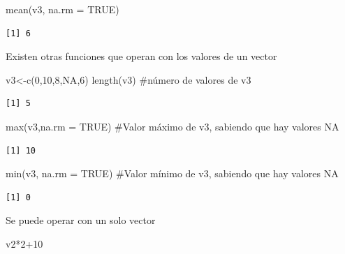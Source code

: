 \documentclass[
  letterpaper,
]{scrbook}
\newenvironment{Shaded}{\begin{snugshade}}{\end{snugshade}}
\newcommand{\AttributeTok}[1]{\textcolor[rgb]{0.40,0.45,0.13}{#1}}
\newcommand{\CommentTok}[1]{\textcolor[rgb]{0.37,0.37,0.37}{#1}}
\newcommand{\ConstantTok}[1]{\textcolor[rgb]{0.56,0.35,0.01}{#1}}
\newcommand{\DecValTok}[1]{\textcolor[rgb]{0.68,0.00,0.00}{#1}}
\newcommand{\FunctionTok}[1]{\textcolor[rgb]{0.28,0.35,0.67}{#1}}
\newcommand{\NormalTok}[1]{\textcolor[rgb]{0.00,0.23,0.31}{#1}}
\newcommand{\OtherTok}[1]{\textcolor[rgb]{0.00,0.23,0.31}{#1}}
\newcommand{\SpecialCharTok}[1]{\textcolor[rgb]{0.37,0.37,0.37}{#1}}
\begin{document}
\begin{Shaded}
\begin{Highlighting}[]
\FunctionTok{mean}\NormalTok{(v3, }\AttributeTok{na.rm =} \ConstantTok{TRUE}\NormalTok{)}
\end{Highlighting}
\end{Shaded}

\begin{verbatim}
[1] 6
\end{verbatim}

Existen otras funciones que operan con los valores de un vector

\begin{Shaded}
\begin{Highlighting}[]
\NormalTok{v3}\OtherTok{\textless{}{-}}\FunctionTok{c}\NormalTok{(}\DecValTok{0}\NormalTok{,}\DecValTok{10}\NormalTok{,}\DecValTok{8}\NormalTok{,}\ConstantTok{NA}\NormalTok{,}\DecValTok{6}\NormalTok{)}
\FunctionTok{length}\NormalTok{(v3) }\CommentTok{\#número de valores de v3}
\end{Highlighting}
\end{Shaded}

\begin{verbatim}
[1] 5
\end{verbatim}

\begin{Shaded}
\begin{Highlighting}[]
\FunctionTok{max}\NormalTok{(v3,}\AttributeTok{na.rm =} \ConstantTok{TRUE}\NormalTok{) }\CommentTok{\#Valor máximo de v3, sabiendo que hay valores NA}
\end{Highlighting}
\end{Shaded}

\begin{verbatim}
[1] 10
\end{verbatim}

\begin{Shaded}
\begin{Highlighting}[]
\FunctionTok{min}\NormalTok{(v3, }\AttributeTok{na.rm =} \ConstantTok{TRUE}\NormalTok{) }\CommentTok{\#Valor mínimo de v3, sabiendo que hay valores NA}
\end{Highlighting}
\end{Shaded}

\begin{verbatim}
[1] 0
\end{verbatim}

Se puede operar con un solo vector

\begin{Shaded}
\begin{Highlighting}[]
\NormalTok{v2}\SpecialCharTok{*}\DecValTok{2}\SpecialCharTok{+}\DecValTok{10}
\end{Highlighting}
\end{Shaded}
\end{document}
